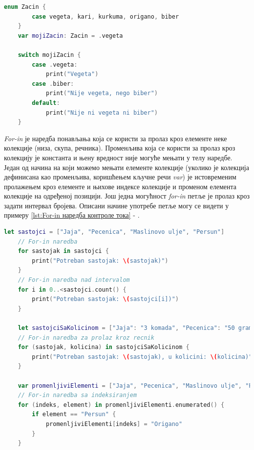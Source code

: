 \documentclass[12pt,oneside]{memoir}
\begin{document}
\begin{lstlisting}[caption=\textit{{Switch наредба контроле тока}}, label={lst:Switch наредба контроле тока}, language=Swift, frame=single]
    enum Zacin {
        case vegeta, kari, kurkuma, origano, biber
    }
    var mojiZacin: Zacin = .vegeta
    
    switch mojiZacin {
        case .vegeta:
            print("Vegeta")
        case .biber:
            print("Nije vegeta, nego biber")
        default:
            print("Nije ni vegeta ni biber")
    }
\end{lstlisting}

\indent \textit{For-in} је наредба понављања која се користи за пролаз кроз елементе неке колекције (низа, скупа, речника). Променљива која се користи за пролаз кроз колекцију је константа и њену вредност није могуће мењати у телу наредбе. Један од начина на који можемо мењати елементе колекције (уколико је колекција дефинисана као променљива, коришћењем кључне речи \textit{var}) је истовременим пролажењем кроз елементе и њихове индексе колекције и променом елемента колекције на одређеној позицији. Још једна могућност \textit{for-in} петље је пролаз кроз задати интервал бројева. Описани начине употребе петље могу се видети у примеру \ref{lst:For-in наредба контроле тока} - .
\begin{lstlisting}[caption=\textit{{For-in наредбa контроле тока}}, label={lst:For-in наредба контроле тока}, language=Swift, frame=single]
    let sastojci = ["Jaja", "Pecenica", "Maslinovo ulje", "Persun"]
    // For-in naredba
    for sastojak in sastojci {
        print("Potreban sastojak: \(sastojak)")
    }
    // For-in naredba nad intervalom
    for i in 0..<sastojci.count() {
        print("Potreban sastojak: \(sastojci[i])")
    }
    
    let sastojciSaKolicinom = ["Jaja": "3 komada", "Pecenica": "50 grama", "Maslinovo ulje": "Koliko je potrebno da pokrije tiganj", "Persun": "Prstohvat"]
    // For-in naredba za prolaz kroz recnik
    for (sastojak, kolicina) in sastojciSaKolicinom {
        print("Potreban sastojak: \(sastojak), u kolicini: \(kolicina)")
    }
    
    var promenljiviElementi = ["Jaja", "Pecenica", "Maslinovo ulje", "Persun"]
    // For-in naredba sa indeksiranjem
    for (indeks, element) in promenljiviElementi.enumerated() {
        if element == "Persun" {
            promenljiviElementi[indeks] = "Origano"
        }
    } 
\end{lstlisting}
\end{document}
